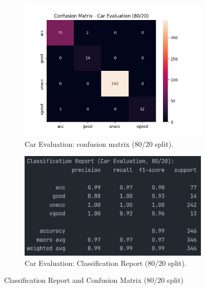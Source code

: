 \begin{figure}[H]
	\centering
	\begin{subfigure}{0.45\textwidth}
		\centering
		\includegraphics[width=\textwidth]{imgs/confusion_mat/confusion_mat__car_evaluation__80_vs_20.png}
		\caption{Car Evaluation: confusion matrix (80/20 split).}\label{fig:ce-cm-80-20}
	\end{subfigure}
	\hfill
	\begin{subfigure}{0.45\textwidth}
		\centering
		\includegraphics[width=\textwidth]{imgs/confusion_mat/class_rp__car_evaluation__80_vs_20.png}
		\caption{Car Evaluation: Classification Report (80/20 split).}\label{fig:ce-cr-80-20}
	\end{subfigure}

	\caption{Classification Report and Confusion Matrix (80/20 split)}\label{fig:ce-eval-80-20}
\end{figure}
